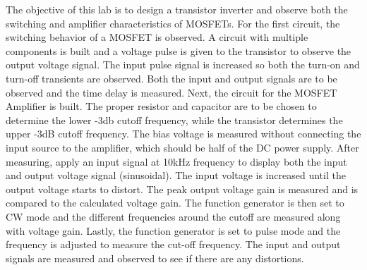 The objective of this lab is to design a transistor inverter and observe both the switching and amplifier characteristics of MOSFETs. For the first circuit, the switching behavior of a MOSFET is observed. A circuit with multiple components is built and a voltage pulse is given to the transistor to observe the output voltage signal. The input pulse signal is increased so both the turn-on and turn-off transients are observed. Both the input and output signals are to be observed and the time delay is measured. Next, the circuit for the MOSFET Amplifier is built. The proper resistor and capacitor are to be chosen to determine the lower -3db cutoff frequency, while the transistor determines the upper -3dB cutoff frequency. The bias voltage is measured without connecting the input source to the amplifier, which should be half of the DC power supply. After measuring, apply an input signal at 10kHz frequency to display both the input and output voltage signal (sinusoidal). The input voltage is increased until the output voltage starts to distort. The peak output voltage gain is measured and is compared to the calculated voltage gain. The function generator is then set to CW mode and the different frequencies around the cutoff are measured along with voltage gain. Lastly, the function generator is set to pulse mode and the frequency is adjusted to measure the cut-off frequency. The input and output signals are measured and observed to see if there are any distortions. \\
